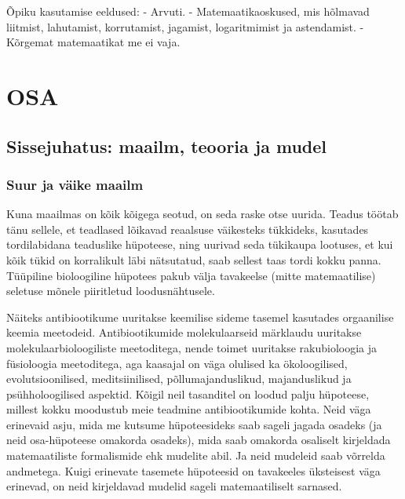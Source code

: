 \documentclass[]{book}
\begin{document}
Õpiku kasutamise eeldused:
- Arvuti.
- Matemaatikaoskused, mis hõlmavad liitmist, lahutamist, korrutamist, jagamist, logaritmimist ja astendamist.
- Kõrgemat matemaatikat me ei vaja.

\hypertarget{part-osa}{%
\part{OSA}\label{part-osa}}

\hypertarget{sissejuhatus-maailm-teooria-ja-mudel}{%
\chapter{Sissejuhatus: maailm, teooria ja mudel}\label{sissejuhatus-maailm-teooria-ja-mudel}}

\hypertarget{suur-ja-vaike-maailm}{%
\section*{Suur ja väike maailm}\label{suur-ja-vaike-maailm}}

Kuna maailmas on kõik kõigega seotud, on seda raske otse uurida.
Teadus töötab tänu sellele, et teadlased lõikavad reaalsuse väikesteks tükkideks, kasutades tordilabidana teaduslike hüpoteese, ning uurivad seda tükikaupa lootuses, et kui kõik tükid on korralikult läbi nätsutatud, saab sellest taas tordi kokku panna. Tüüpiline bioloogiline hüpotees pakub välja tavakeelse (mitte matemaatilise) seletuse mõnele piiritletud loodusnähtusele.

Näiteks antibiootikume uuritakse keemilise sideme tasemel kasutades orgaanilise keemia meetodeid. Antibiootikumide molekulaarseid märklaudu uuritakse molekulaarbioloogiliste meetoditega, nende toimet uuritakse rakubioloogia ja füsioloogia meetoditega, aga kaasajal on väga olulised ka ökoloogilised, evolutsioonilised, meditsiinilised, põllumajanduslikud, majanduslikud ja psühholoogilised aspektid. Kõigil neil tasanditel on loodud palju hüpoteese, millest kokku moodustub meie teadmine antibiootikumide kohta. Neid väga erinevaid asju, mida me kutsume hüpoteesideks saab sageli jagada osadeks (ja neid osa-hüpoteese omakorda osadeks), mida saab omakorda osaliselt kirjeldada matemaatiliste formalismide ehk mudelite abil. Ja neid mudeleid saab võrrelda andmetega. Kuigi erinevate tasemete hüpoteesid on tavakeeles üksteisest väga erinevad, on neid kirjeldavad mudelid sageli matemaatiliselt sarnased.
\end{document}
